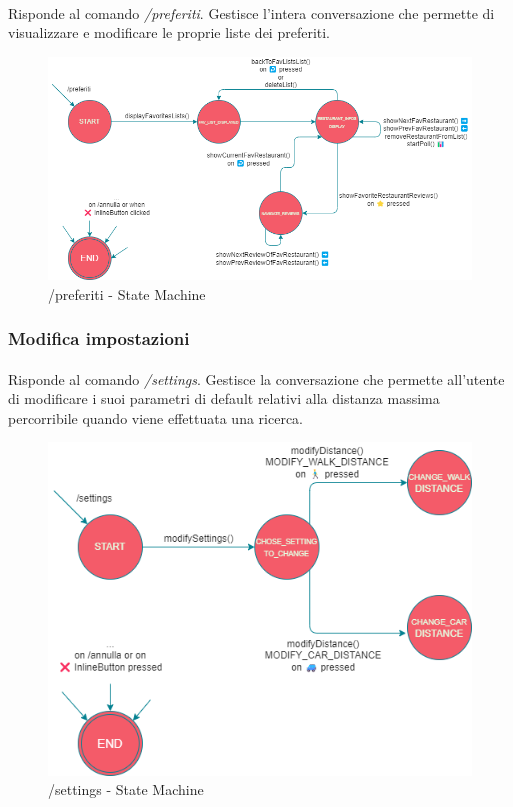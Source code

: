 \documentclass[a4paper, 12pt]{article}
\begin{document}
	\paragraph{}
	Risponde al comando \textit{/preferiti}. Gestisce l'intera conversazione che permette di visualizzare e modificare le proprie liste dei preferiti.\\
	\begin{figure}[h!]
		\centering
		\includegraphics[scale=0.6]{TasteIt_Preferiti_StateMachine.png}
		\caption{/preferiti - State Machine}
		\label{fig:PreferitiStateMachine}
	\end{figure}

	\subsubsection{Modifica impostazioni}
	\paragraph{}
	Risponde al comando \textit{/settings}. Gestisce la conversazione che permette all'utente di modificare i suoi parametri di default relativi alla distanza massima percorribile quando viene effettuata una ricerca.
	\newpage
	\begin{figure}[h!]
		\centering
		\includegraphics[scale=0.5]{TasteIt_Settings_StateMachine.png}
		\caption{/settings - State Machine}
		\label{fig:SettingsStateMachine}
	\end{figure}
\end{document}
